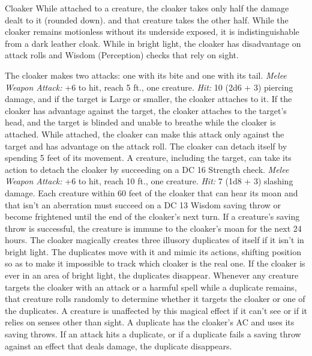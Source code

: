 \documentclass[10pt,a4paper,twoside,twocolumn,openany,bg=none,nodeprecatedcode]{dndbook}
\begin{document}
\begin{DndMonster}[float*=t]{Cloaker}
\DndMonsterBasics[
armor-class = {14 (natural armor)},
hit-points = {\DndDice{12d10 + 12}},
speed = {10 ft., 40 ft. (key)}
]
\DndMonsterAbilityScores[
 str = 17,
 dex = 15,
 con = 12,
 int = 13,
 wis = 12,
 cha = 14
]
\DndMonsterDetails[
skills = {Stealth +5},
senses = {darkvision 60 ft., passive perception 11},
languages = {Deep Speech, Undercommon},
challenge = 8,
]
While attached to a creature, the cloaker takes only half the damage dealt to it (rounded down). and that creature takes the other half.
While the cloaker remains motionless without its underside exposed, it is indistinguishable from a dark leather cloak.
While in bright light, the cloaker has disadvantage on attack rolls and Wisdom (Perception) checks that rely on sight.
\par
{}
The cloaker makes two attacks: one with its bite and one with its tail.
\textsl{Melee Weapon Attack:} +6 to hit, reach 5 ft., one creature. \textsl{Hit:} 10 (2d6 + 3) piercing damage, and if the target is Large or smaller, the cloaker attaches to it. If the cloaker has advantage against the target, the cloaker attaches to the target's head, and the target is blinded and unable to breathe while the cloaker is attached. While attached, the cloaker can make this attack only against the target and has advantage on the attack roll. The cloaker can detach itself by spending 5 feet of its movement. A creature, including the target, can take its action to detach the cloaker by succeeding on a DC 16 Strength check.
\textsl{Melee Weapon Attack:} +6 to hit, reach 10 ft., one creature. \textsl{Hit:} 7 (1d8 + 3) slashing damage.
Each creature within 60 feet of the cloaker that can hear its moan and that isn't an aberration must succeed on a DC 13 Wisdom saving throw or become frightened until the end of the cloaker's next turn. If a creature's saving throw is successful, the creature is immune to the cloaker's moan for the next 24 hours.
The cloaker magically creates three illusory duplicates of itself if it isn't in bright light. The duplicates move with it and mimic its actions, shifting position so as to make it impossible to track which cloaker is the real one. If the cloaker is ever in an area of bright light, the duplicates disappear.
Whenever any creature targets the cloaker with an attack or a harmful spell while a duplicate remains, that creature rolls randomly to determine whether it targets the cloaker or one of the duplicates. A creature is unaffected by this magical effect if it can't see or if it relies on senses other than sight.
A duplicate has the cloaker's AC and uses its saving throws. If an attack hits a duplicate, or if a duplicate fails a saving throw against an effect that deals damage, the duplicate disappears.
\end{DndMonster}
\end{document}
